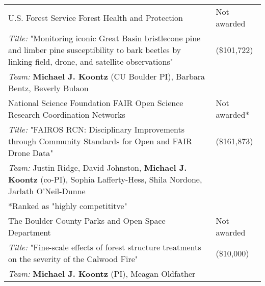 \begin{longtable}{@{}>{\raggedright}p{5.25in} @{} >{\raggedleft}X@{}}

U.S. Forest Service Forest Health and Protection & Not awarded \tabularnewline
\addtolength{\leftskip}{5ex}\emph{Title:} "Monitoring iconic Great Basin bristlecone pine and limber pine susceptibility to bark beetles by linking field, drone, and satellite observations" & (\$101,722) \tabularnewline
\addtolength{\leftskip}{5ex}\emph{Team:} \textbf{Michael J. Koontz} (CU Boulder PI), Barbara Bentz, Beverly Bulaon & \tabularnewline

National Science Foundation FAIR Open Science Research Coordination Networks & Not awarded* \tabularnewline
\addtolength{\leftskip}{5ex}\emph{Title:} "FAIROS RCN: Disciplinary Improvements through Community Standards for Open and FAIR Drone Data" & (\$161,873) \tabularnewline
\addtolength{\leftskip}{5ex}\emph{Team:} Justin Ridge, David Johnston, \textbf{Michael J. Koontz} (co-PI), Sophia Lafferty-Hess, Shila Nordone, Jarlath O'Neil-Dunne \tabularnewline
\addtolength{\leftskip}{5ex} *Ranked as "highly competititve" & \tabularnewline

The Boulder County Parks and Open Space Department & Not awarded \tabularnewline
\addtolength{\leftskip}{5ex}\emph{Title:} "Fine-scale effects of forest structure treatments on the severity of the Calwood Fire" & (\$10,000) \tabularnewline
\addtolength{\leftskip}{5ex}\emph{Team:} \textbf{Michael J. Koontz} (PI), Meagan Oldfather & \tabularnewline

\end{longtable}
